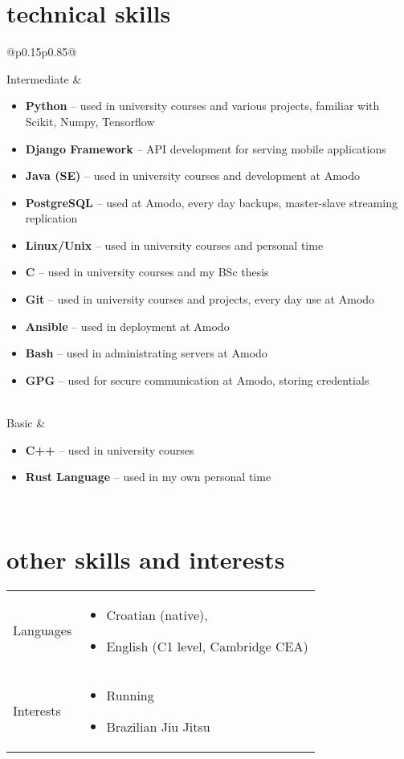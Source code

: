 \documentclass[a4paper]{article}
\makeatletter
\newlength{\tablewidth}
\newenvironment{skills}{%
\setlength{\tablewidth}{\linewidth}
\addtolength{\tablewidth}{-2\tabcolsep}
\begin{tabular}{@{}p{0.15\tablewidth}p{0.85\tablewidth}@{}}
}{%
\end{tabular}
}
\makeatother
\begin{document}
\section{technical skills}
\begin{skills}
    Intermediate &
    \begin{itemize}
        \item \textbf{Python} -- used in university courses and various projects, familiar with Scikit, Numpy, Tensorflow
        \item \textbf{Django Framework} -- API development for serving mobile applications
        \item \textbf{Java (SE)} -- used in university courses and development at Amodo 
        \item \textbf{PostgreSQL} -- used at Amodo, every day backups, master-slave streaming replication
        \item \textbf{Linux/Unix} -- used in university courses and personal time
        \item \textbf{C} -- used in university courses and my BSc thesis
        \item \textbf{Git} -- used in university courses and projects, every day use at Amodo
        \item \textbf{Ansible} -- used in deployment at Amodo
        \item \textbf{Bash} -- used in administrating servers at Amodo
        \item \textbf{GPG} -- used for secure communication at Amodo, storing credentials
    \end{itemize} \\
    Basic &
    \begin{itemize}
        \item \textbf{C++} -- used in university courses
        \item \textbf{Rust Language} -- used in my own personal time
    \end{itemize} \\
\end{skills}

\section{other skills and interests}
\begin{skills}
        Languages &
        \begin{itemize}
                \item Croatian (native),
                \item English (C1 level, Cambridge CEA)
        \end{itemize} \\
        Interests &
        \begin{itemize}
                \item Running
        \item Brazilian Jiu Jitsu
    \end{itemize} \\
\end{skills}
\end{document}
